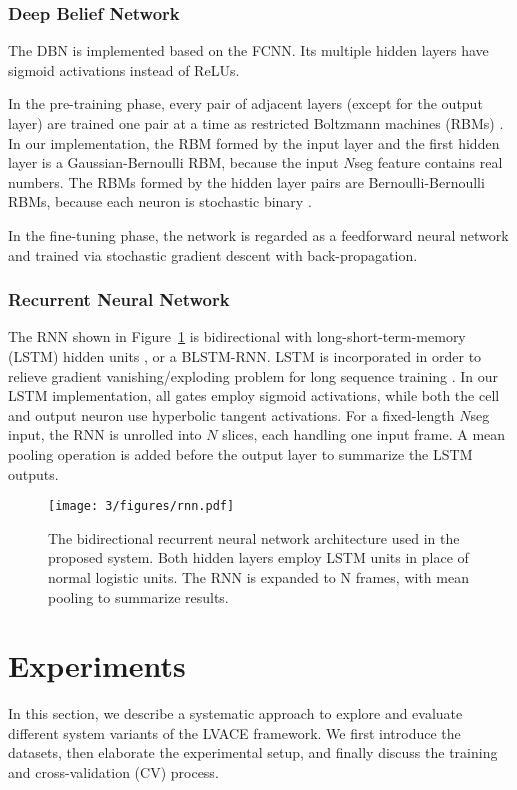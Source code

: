 \subsubsection{Deep Belief Network}

The DBN is implemented based on the FCNN. Its multiple hidden layers have sigmoid activations instead of ReLUs.

In the pre-training phase, every pair of adjacent layers (except for the output layer) are trained one pair at a time as restricted Boltzmann machines (RBMs) \cite{hinton2006fast}. In our implementation, the RBM formed by the input layer and the first hidden layer is a Gaussian-Bernoulli RBM, because the input $N$seg feature contains real numbers. The RBMs formed by the hidden layer pairs are Bernoulli-Bernoulli RBMs, because each neuron is stochastic binary \cite{hinton2006reducing}.

In the fine-tuning phase, the network is regarded as a feedforward neural network and trained via stochastic gradient descent with back-propagation.

\subsubsection{Recurrent Neural Network}

The RNN shown in Figure~\ref{fig:3-rnn} is bidirectional with long-short-term-memory (LSTM) hidden units \cite{hochreiter1997long}, or a BLSTM-RNN. LSTM is incorporated in order to relieve gradient vanishing/exploding problem for long sequence training \cite{bengio2009learning}. In our LSTM implementation, all gates employ sigmoid activations, while both the cell and output neuron use hyperbolic tangent activations. For a fixed-length $N$seg input, the RNN is unrolled into $N$ slices, each handling one input frame. A mean pooling operation is added before the output layer to summarize the LSTM outputs.

\begin{figure}[h]
\centering
\texttt{[image: 3/figures/rnn.pdf]}
\caption{The bidirectional recurrent neural network architecture used in the proposed system. Both hidden layers employ LSTM units in place of normal logistic units. The RNN is expanded to N frames, with mean pooling to summarize results.}
\label{fig:3-rnn}
\end{figure}

\section{Experiments} \label{sec:3-exper}
In this section, we describe a systematic approach to explore and evaluate different system variants of the LVACE framework. We first introduce the datasets, then elaborate the experimental setup, and finally discuss the training and cross-validation (CV) process.

